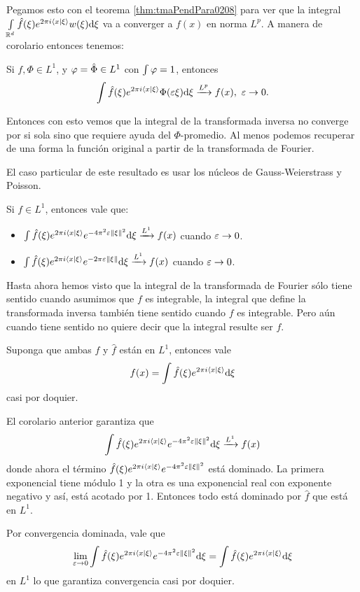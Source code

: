 \documentclass[12pt]{memoir}
\begin{document}
Pegamos esto con el teorema \ref{thm:tmaPendPara0208} para ver que la integral $\int\limits_{\mathbb{R}^d}\hat{f}(\xi)e^{2\pi i\braket{x}{\xi}}w(\xi)\dd\xi$ va a converger a $f(x)$ en norma $L^p$. A manera de corolario entonces tenemos:

\begin{Cor}
Si $f,\Phi\in L^1$, y $\varphi=\hat\Phi\in L^1$ con $\int\varphi=1$, entonces
$$\int\hat{f}(\xi)e^{2\pi i\braket{x}{\xi}}\Phi(\varepsilon\xi)\dd\xi\xrightarrow[]{L^p}f(x),\ \varepsilon\to 0.$$
\end{Cor}

Entonces con esto vemos que la integral de la transformada inversa no converge por si sola sino que requiere ayuda del $\Phi$-promedio. Al menos podemos recuperar de una forma la función original a partir de la transformada de Fourier.\par 
El caso particular de este resultado es usar los núcleos de Gauss-Weierstrass y Poisson.

\begin{Cor}
  Si $f\in L^1$, entonces vale que:
  \begin{itemize}
    \item $\int\hat{f}(\xi)e^{2\pi i\braket{x}{\xi}}e^{-4\pi^2\varepsilon\left\|\xi\right\|^2}\dd\xi\xrightarrow[]{L^1}f(x)$ cuando $\varepsilon\to 0$.
    \item $\int\hat{f}(\xi)e^{2\pi i\braket{x}{\xi}}e^{-2\pi\varepsilon\left\|\xi\right\|}\dd\xi\xrightarrow[]{L^1}f(x)$ cuando $\varepsilon\to 0$.
  \end{itemize}
\end{Cor}

Hasta ahora hemos visto que la integral de la transformada de Fourier sólo tiene sentido cuando asumimos que $f$ es integrable, la integral que define la transformada inversa también tiene sentido cuando $f$ es integrable. Pero aún cuando tiene sentido no quiere decir que la integral resulte ser $f$. 

\begin{Cor}
  Suponga que ambas $f$ y $\hat{f}$ están en $L^1$, entonces vale
  $$f(x)=\int\hat{f}(\xi)e^{2\pi i\braket{x}{\xi}}\dd\xi$$ %
  casi por doquier.
\end{Cor}

\begin{ptcbp}
  El corolario anterior garantiza que 
  $$\int\hat{f}(\xi)e^{2\pi i\braket{x}{\xi}}e^{-4\pi^2\varepsilon\left\|\xi\right\|^2}\dd\xi\xrightarrow[]{L^1}f(x)$$
  donde ahora el término $\hat{f}(\xi)e^{2\pi i\braket{x}{\xi}}e^{-4\pi^2\varepsilon\left\|\xi\right\|^2}$ está dominado. La primera exponencial tiene módulo 1 y la otra es una exponencial real con exponente negativo y así, está acotado por 1. Entonces todo está dominado por $\hat{f}$ que está en $L^1$.\par 
  Por convergencia dominada, vale que 
  $$\lim_{\varepsilon\to0}\int\hat{f}(\xi)e^{2\pi i\braket{x}{\xi}}e^{-4\pi^2\varepsilon\left\|\xi\right\|^2}\dd\xi=\int\hat{f}(\xi)e^{2\pi i\braket{x}{\xi}}\dd\xi$$
  en $L^1$ lo que garantiza convergencia casi por doquier.
\end{ptcbp}
\end{document}
